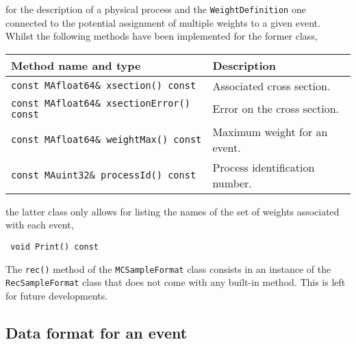 \documentclass[a4paper]{article}
\begin{document}
for the description of a physical process and the {\color{ao}\verb+WeightDefinition+} one
connected to the potential assignment of multiple weights to a given
event\cite{Andersen:2014efa}. Whilst the
following methods have been implemented for the former class,
\renewcommand{\arraystretch}{1.2}%
\begin{center}\begin{tabular}{l p{4.8cm}}
\hline
Method name and type & Description\\
\hline
\color{ao}\verb+const MAfloat64& xsection() const+ & Associated cross section.\\
\color{ao}\verb+const MAfloat64& xsectionError() const+ & Error on the cross
  section.\\
\color{ao}\verb+const MAfloat64& weightMax() const+ & Maximum weight for an event.\\
\color{ao}\verb+const MAuint32& processId() const+ & Process identification number.\\
\hline
\end{tabular}
\end{center}
the latter class only allows for listing the names of the set of weights
associated with each event,
{\color{ao}\begin{verbatim}
 void Print() const
\end{verbatim}}
The {\color{ao}\verb+rec()+} method of the {\color{ao}\verb+MCSampleFormat+} class consists in an
instance of the {\color{ao}\verb?RecSampleFormat?} class that does not come with any
built-in method. This is left for future developments.

\newpage
\begin{shaded}
\section{\Large Data format for an event}
\end{shaded}
\end{document}

